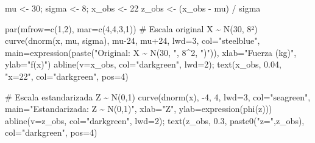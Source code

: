 \documentclass[
  letterpaper,
  DIV=11,
  numbers=noendperiod]{scrartcl}
\newenvironment{Shaded}{\begin{snugshade}}{\end{snugshade}}
\newcommand{\AttributeTok}[1]{\textcolor[rgb]{0.40,0.45,0.13}{#1}}
\newcommand{\CommentTok}[1]{\textcolor[rgb]{0.37,0.37,0.37}{#1}}
\newcommand{\DecValTok}[1]{\textcolor[rgb]{0.68,0.00,0.00}{#1}}
\newcommand{\FloatTok}[1]{\textcolor[rgb]{0.68,0.00,0.00}{#1}}
\newcommand{\FunctionTok}[1]{\textcolor[rgb]{0.28,0.35,0.67}{#1}}
\newcommand{\NormalTok}[1]{\textcolor[rgb]{0.00,0.23,0.31}{#1}}
\newcommand{\OtherTok}[1]{\textcolor[rgb]{0.00,0.23,0.31}{#1}}
\newcommand{\SpecialCharTok}[1]{\textcolor[rgb]{0.37,0.37,0.37}{#1}}
\newcommand{\StringTok}[1]{\textcolor[rgb]{0.13,0.47,0.30}{#1}}
\begin{document}
\begin{Shaded}
\begin{Highlighting}[]
\NormalTok{mu }\OtherTok{\textless{}{-}} \DecValTok{30}\NormalTok{; sigma }\OtherTok{\textless{}{-}} \DecValTok{8}\NormalTok{; x\_obs }\OtherTok{\textless{}{-}} \DecValTok{22}
\NormalTok{z\_obs }\OtherTok{\textless{}{-}}\NormalTok{ (x\_obs }\SpecialCharTok{{-}}\NormalTok{ mu) }\SpecialCharTok{/}\NormalTok{ sigma}

\FunctionTok{par}\NormalTok{(}\AttributeTok{mfrow=}\FunctionTok{c}\NormalTok{(}\DecValTok{1}\NormalTok{,}\DecValTok{2}\NormalTok{), }\AttributeTok{mar=}\FunctionTok{c}\NormalTok{(}\DecValTok{4}\NormalTok{,}\DecValTok{4}\NormalTok{,}\DecValTok{3}\NormalTok{,}\DecValTok{1}\NormalTok{))}
\CommentTok{\# Escala original X \textasciitilde{} N(30, 8²)}
\FunctionTok{curve}\NormalTok{(}\FunctionTok{dnorm}\NormalTok{(x, mu, sigma), mu}\DecValTok{{-}24}\NormalTok{, mu}\SpecialCharTok{+}\DecValTok{24}\NormalTok{, }\AttributeTok{lwd=}\DecValTok{3}\NormalTok{, }\AttributeTok{col=}\StringTok{"steelblue"}\NormalTok{,}
      \AttributeTok{main=}\FunctionTok{expression}\NormalTok{(}\FunctionTok{paste}\NormalTok{(}\StringTok{"Original: X \textasciitilde{} N(30, "}\NormalTok{, }\DecValTok{8}\SpecialCharTok{\^{}}\DecValTok{2}\NormalTok{, }\StringTok{")"}\NormalTok{)),}
      \AttributeTok{xlab=}\StringTok{"Fuerza (kg)"}\NormalTok{, }\AttributeTok{ylab=}\StringTok{"f(x)"}\NormalTok{)}
\FunctionTok{abline}\NormalTok{(}\AttributeTok{v=}\NormalTok{x\_obs, }\AttributeTok{col=}\StringTok{"darkgreen"}\NormalTok{, }\AttributeTok{lwd=}\DecValTok{2}\NormalTok{); }\FunctionTok{text}\NormalTok{(x\_obs, }\FloatTok{0.04}\NormalTok{, }\StringTok{"x=22"}\NormalTok{, }\AttributeTok{col=}\StringTok{"darkgreen"}\NormalTok{, }\AttributeTok{pos=}\DecValTok{4}\NormalTok{)}

\CommentTok{\# Escala estandarizada Z \textasciitilde{} N(0,1)}
\FunctionTok{curve}\NormalTok{(}\FunctionTok{dnorm}\NormalTok{(x), }\SpecialCharTok{{-}}\DecValTok{4}\NormalTok{, }\DecValTok{4}\NormalTok{, }\AttributeTok{lwd=}\DecValTok{3}\NormalTok{, }\AttributeTok{col=}\StringTok{"seagreen"}\NormalTok{,}
      \AttributeTok{main=}\StringTok{"Estandarizada: Z \textasciitilde{} N(0,1)"}\NormalTok{,}
      \AttributeTok{xlab=}\StringTok{"Z"}\NormalTok{, }\AttributeTok{ylab=}\FunctionTok{expression}\NormalTok{(}\FunctionTok{phi}\NormalTok{(z)))}
\FunctionTok{abline}\NormalTok{(}\AttributeTok{v=}\NormalTok{z\_obs, }\AttributeTok{col=}\StringTok{"darkgreen"}\NormalTok{, }\AttributeTok{lwd=}\DecValTok{2}\NormalTok{); }\FunctionTok{text}\NormalTok{(z\_obs, }\FloatTok{0.3}\NormalTok{, }\FunctionTok{paste0}\NormalTok{(}\StringTok{"z="}\NormalTok{,z\_obs), }\AttributeTok{col=}\StringTok{"darkgreen"}\NormalTok{, }\AttributeTok{pos=}\DecValTok{4}\NormalTok{)}
\end{Highlighting}
\end{Shaded}
\end{document}
